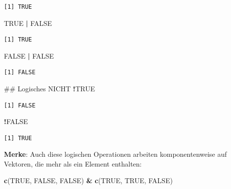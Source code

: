 \documentclass[12pt,]{tufte-book}
\newenvironment{Shaded}{\begin{snugshade}}{\end{snugshade}}
\newcommand{\KeywordTok}[1]{\textcolor[rgb]{0.13,0.29,0.53}{\textbf{#1}}}
\newcommand{\StringTok}[1]{\textcolor[rgb]{0.31,0.60,0.02}{#1}}
\newcommand{\OtherTok}[1]{\textcolor[rgb]{0.56,0.35,0.01}{#1}}
\newcommand{\OperatorTok}[1]{\textcolor[rgb]{0.81,0.36,0.00}{\textbf{#1}}}
\newcommand{\NormalTok}[1]{#1}
\theoremstyle{definition}
\theoremstyle{definition}
\theoremstyle{definition}
\theoremstyle{remark}
\begin{document}
\begin{verbatim}
[1] TRUE
\end{verbatim}

\begin{Shaded}
\begin{Highlighting}[]
\OtherTok{TRUE} \OperatorTok{|}\StringTok{ }\OtherTok{FALSE}
\end{Highlighting}
\end{Shaded}

\begin{verbatim}
[1] TRUE
\end{verbatim}

\begin{Shaded}
\begin{Highlighting}[]
\OtherTok{FALSE} \OperatorTok{|}\StringTok{ }\OtherTok{FALSE}
\end{Highlighting}
\end{Shaded}

\begin{verbatim}
[1] FALSE
\end{verbatim}

\begin{Shaded}
\begin{Highlighting}[]
\NormalTok{## Logisches NICHT}
\OperatorTok{!}\OtherTok{TRUE}
\end{Highlighting}
\end{Shaded}

\begin{verbatim}
[1] FALSE
\end{verbatim}

\begin{Shaded}
\begin{Highlighting}[]
\OperatorTok{!}\OtherTok{FALSE}
\end{Highlighting}
\end{Shaded}

\begin{verbatim}
[1] TRUE
\end{verbatim}

\textbf{Merke}: Auch diese logischen Operationen arbeiten
komponentenweise auf Vektoren, die mehr als ein Element enthalten:

\begin{Shaded}
\begin{Highlighting}[]
\KeywordTok{c}\NormalTok{(}\OtherTok{TRUE}\NormalTok{, }\OtherTok{FALSE}\NormalTok{, }\OtherTok{FALSE}\NormalTok{) }\OperatorTok{&}\StringTok{ }\KeywordTok{c}\NormalTok{(}\OtherTok{TRUE}\NormalTok{, }\OtherTok{TRUE}\NormalTok{, }\OtherTok{FALSE}\NormalTok{)}
\end{Highlighting}
\end{Shaded}
\end{document}
